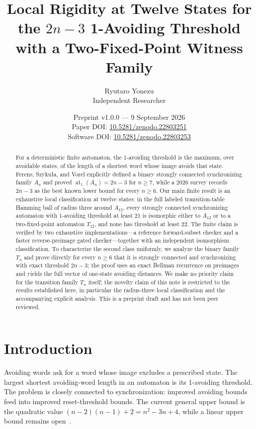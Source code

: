 \documentclass[11pt]{article}
\title{Local Rigidity at Twelve States for the $2n-3$ 1-Avoiding Threshold\\
with a Two-Fixed-Point Witness Family}
\author{Ryutaro Yonezu\\Independent Researcher}
\date{Preprint v1.0.0 --- 9 September 2026\\Paper DOI: \href{https://doi.org/10.5281/zenodo.22803251}{10.5281/zenodo.22803251}\\Software DOI: \href{https://doi.org/10.5281/zenodo.22803253}{10.5281/zenodo.22803253}}
\theoremstyle{definition}
\theoremstyle{remark}
\begin{document}
\maketitle

\begin{abstract}
For a deterministic finite automaton, the 1-avoiding threshold is the maximum, over avoidable states, of the length of a shortest word whose image avoids that state. Ferens, Szyku\l a, and Vorel explicitly defined a binary strongly connected synchronizing family $A_n$ and proved $\operatorname{at}_1(A_n)=2n-3$ for $n\ge7$, while a 2026 survey records $2n-3$ as the best known lower bound for every $n\ge6$. Our main finite result is an exhaustive local classification at twelve states: in the full labeled transition-table Hamming ball of radius three around $A_{12}$, every strongly connected synchronizing automaton with 1-avoiding threshold at least 21 is isomorphic either to $A_{12}$ or to a two-fixed-point automaton $T_{12}$, and none has threshold at least 22. The finite claim is verified by two exhaustive implementations---a reference forward-subset checker and a faster reverse-preimage gated checker---together with an independent isomorphism classification. To characterize the second class uniformly, we analyze the binary family $T_n$ and prove directly for every $n\ge6$ that it is strongly connected and synchronizing with exact threshold $2n-3$; the proof uses an exact Bellman recurrence on preimages and yields the full vector of one-state avoiding distances. We make no priority claim for the transition family $T_n$ itself; the novelty claim of this note is restricted to the results established here, in particular the radius-three local classification and the accompanying explicit analysis. This is a preprint draft and has not been peer reviewed.
\end{abstract}

\section{Introduction}
Avoiding words ask for a word whose image excludes a prescribed state. The largest shortest avoiding-word length in an automaton is its 1-avoiding threshold. The problem is closely connected to synchronization: improved avoiding bounds feed into improved reset-threshold bounds. The current general upper bound is the quadratic value $(n-2)(n-1)+2=n^2-3n+4$, while a linear upper bound remains open~\cite{Szykula2026}.
\end{document}
